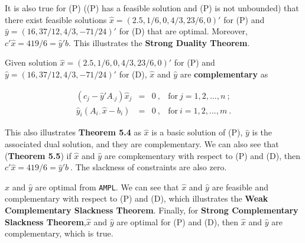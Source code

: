 It is also true for (P) ((P) has a feasible solution and (P) is not unbounded) that there exist feasible solutions $\hat{x}=(2.5,1/6,0,4/3,23/6,0)'$ for (P) and $\hat{y}=(16,37/12,4/3,-71/24)'$ for (D) that are optimal. Moreover,  $c'\hat{x} = 419/6 = \hat{y}'b.$ This illustrates the \textbf{Strong Duality Theorem}.

Given solution  $\hat{x}=(2.5,1/6,0,4/3,23/6,0)'$ for (P) and $\hat{y}=(16,37/12,4/3,-71/24)'$ for (D), $\hat{x}$ and $\hat{y}$ are \textbf{complementary} as

\[
\begin{array}{rccl}
 (c_j-\hat{y}'A_{\cdot j})\hat{x}_j &  = & 0~,& \text{for}~j=1,2,...,n ~; \\
 \hat{y}_i(A_{i\cdot}\hat{x}-b_i) & = & 0~, & \text{for}~i=1,2,...,m ~.
\end{array}
\]

This also illustrates \textbf{Theorem 5.4} as $\hat{x}$ is a basic solution of (P), $\hat{y}$ is the associated dual solution, and they are complementary. We can also see that (\textbf{Theorem 5.5}) if $\hat{x}$ and $\hat{y}$ are compkementary with respect to (P) and (D), then $c'\hat{x} = 419/6 = \hat{y}'b~.$ The slackness of constraints are also zero.

$\hat{x}$ and $\hat{y}$ are optimal from {\tt AMPL}. We can see that $\hat{x}$ and $\hat{y}$ are feasible and complementary with respect to (P) and (D), which illustrates the \textbf{Weak Complementary Slackness Theorem}. Finally, for \textbf{Strong Complementary Slackness Theorem},$\hat{x}$ and $\hat{y}$ are optimal for (P) and (D), then $\hat{x}$ and $\hat{y}$ are complementary, which is true.